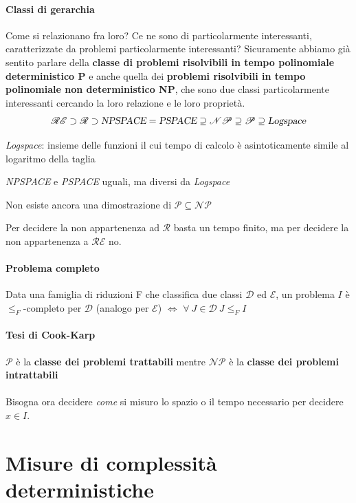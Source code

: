 \documentclass[10pt]{book}
\begin{document}
\paragraph{Classi di gerarchia} Come si relazionano fra loro? Ce ne sono di particolarmente interessanti, caratterizzate da problemi particolarmente interessanti? Sicuramente abbiamo già sentito parlare della \textbf{classe di problemi risolvibili in tempo polinomiale deterministico P} e anche quella dei  \textbf{problemi risolvibili in tempo polinomiale non deterministico NP}, che sono due classi particolarmente interessanti cercando la loro relazione e le loro proprietà.
$$\mathscr{RE} \supset \mathscr{R} \supset \textsl{NPSPACE} = \textsl{PSPACE} \supseteq \mathscr{NP} \supseteq \mathscr{P} \supseteq \textsl{Logspace}$$
\begin{list}{}{Considerando}
	\item \textsl{Logspace}: insieme delle funzioni il cui tempo di calcolo è asintoticamente simile al logaritmo della taglia
	\item \textsl{NPSPACE} e \textsl{PSPACE} uguali, ma diversi da \textsl{Logspace}
	\item Non esiste ancora una dimostrazione di $\mathscr{P} \subseteq \mathscr{NP}$
	\item Per decidere la non appartenenza ad $\mathscr{R}$ basta un tempo finito, ma per decidere la non appartenenza a $\mathscr{RE}$ no.
\end{list}
\paragraph{Problema completo} Data una famiglia di riduzioni F che classifica due classi $\mathscr{D}$ ed $\mathscr{E}$, un problema $I$ è $\leq_F$-completo per $\mathscr{D}$ (analogo per $\mathscr{E}$) $\Leftrightarrow$ $\forall\:J\in\mathscr{D}\:J\leq_F I$
\paragraph{Tesi di Cook-Karp} $\mathscr{P}$ è la \textbf{classe dei problemi trattabili} mentre $\mathscr{NP}$ è la \textbf{classe dei problemi intrattabili}
\paragraph{} Bisogna ora decidere \textit{come} si misuro lo spazio o il tempo necessario per decidere $x \in I$.
\pagebreak
\section{Misure di complessità deterministiche}
\end{document}
